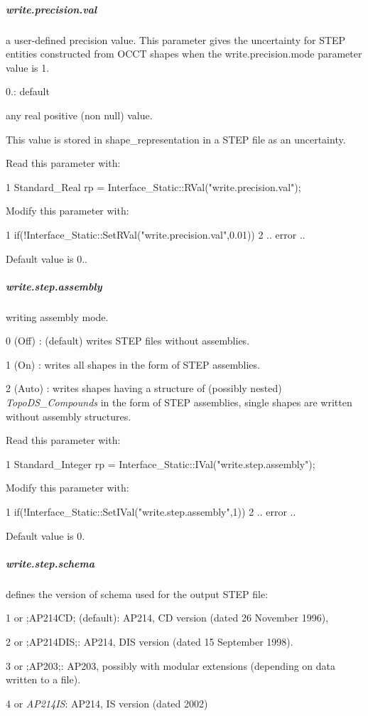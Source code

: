 \subparagraph*{write.\+precision.\+val}

a user-\/defined precision value. This parameter gives the uncertainty for S\+T\+EP entities constructed from O\+C\+CT shapes when the write.\+precision.\+mode parameter value is 1.
\begin{DoxyItemize}
\item 0.\+: default
\item any real positive (non null) value.
\end{DoxyItemize}

This value is stored in shape\+\_\+representation in a S\+T\+EP file as an uncertainty.

Read this parameter with\+: 
\begin{DoxyCode}
1 Standard\_Real rp = Interface\_Static::RVal("write.precision.val");  
\end{DoxyCode}


Modify this parameter with\+: 
\begin{DoxyCode}
1 if(!Interface\_Static::SetRVal("write.precision.val",0.01))  
2 .. error .. 
\end{DoxyCode}
 Default value is 0..

\subparagraph*{write.\+step.\+assembly}

writing assembly mode.
\begin{DoxyItemize}
\item 0 (Off) \+: (default) writes S\+T\+EP files without assemblies.
\item 1 (On) \+: writes all shapes in the form of S\+T\+EP assemblies.
\item 2 (Auto) \+: writes shapes having a structure of (possibly nested) {\itshape Topo\+D\+S\+\_\+\+Compounds} in the form of S\+T\+EP assemblies, single shapes are written without assembly structures.
\end{DoxyItemize}

Read this parameter with\+: 
\begin{DoxyCode}
1 Standard\_Integer rp = Interface\_Static::IVal("write.step.assembly"); 
\end{DoxyCode}
 Modify this parameter with\+: 
\begin{DoxyCode}
1 if(!Interface\_Static::SetIVal("write.step.assembly",1))  
2 .. error .. 
\end{DoxyCode}
 Default value is 0.

\subparagraph*{write.\+step.\+schema}

defines the version of schema used for the output S\+T\+EP file\+:
\begin{DoxyItemize}
\item 1 or ;A\+P214\+CD; (default)\+: A\+P214, CD version (dated 26 November 1996),
\item 2 or ;A\+P214\+D\+IS;\+: A\+P214, D\+IS version (dated 15 September 1998).
\item 3 or ;A\+P203;\+: A\+P203, possibly with modular extensions (depending on data written to a file).
\item 4 or {\itshape A\+P214\+IS}\+: A\+P214, IS version (dated 2002)
\end{DoxyItemize}

